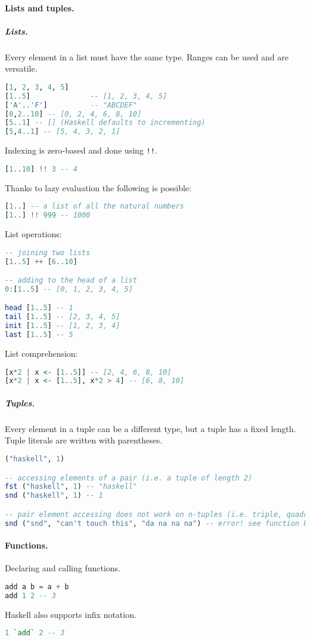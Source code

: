 \paragraph{Lists and tuples.}
\subparagraph{Lists.}
Every element in a list must have the same type. Ranges can be used and are versatile.
\begin{lstlisting}[language=haskell, style=snippet]
[1, 2, 3, 4, 5]
[1..5]              -- [1, 2, 3, 4, 5]
['A'..'F']          -- "ABCDEF"
[0,2..10] -- [0, 2, 4, 6, 8, 10]
[5..1] -- [] (Haskell defaults to incrementing)
[5,4..1] -- [5, 4, 3, 2, 1]
\end{lstlisting}
Indexing is zero-based and done using \texttt{!!}.
\begin{lstlisting}[language=haskell, style=snippet]
[1..10] !! 3 -- 4
\end{lstlisting}
Thanks to lazy evaluation the following is possible:
\begin{lstlisting}[language=haskell, style=snippet]
[1..] -- a list of all the natural numbers
[1..] !! 999 -- 1000
\end{lstlisting}
List operations:
\begin{lstlisting}[language=haskell, style=snippet]
-- joining two lists
[1..5] ++ [6..10]

-- adding to the head of a list
0:[1..5] -- [0, 1, 2, 3, 4, 5]

head [1..5] -- 1
tail [1..5] -- [2, 3, 4, 5]
init [1..5] -- [1, 2, 3, 4]
last [1..5] -- 5
\end{lstlisting}
List comprehension:
\begin{lstlisting}[language=haskell, style=snippet]
[x*2 | x <- [1..5]] -- [2, 4, 6, 8, 10]
[x*2 | x <- [1..5], x*2 > 4] -- [6, 8, 10]
\end{lstlisting}

\subparagraph{Tuples.} Every element in a tuple can be a different type, but a tuple has a fixed length. Tuple literals are written with parentheses.
\begin{lstlisting}[language=haskell, style=snippet]
("haskell", 1)

-- accessing elements of a pair (i.e. a tuple of length 2)
fst ("haskell", 1) -- "haskell"
snd ("haskell", 1) -- 1

-- pair element accessing does not work on n-tuples (i.e. triple, quadruple, etc)
snd ("snd", "can't touch this", "da na na na") -- error! see function below
\end{lstlisting}

\paragraph{Functions.}
Declaring and calling functions.
\begin{lstlisting}[language=haskell, style=snippet]
add a b = a + b
add 1 2 -- 3
\end{lstlisting}
Haskell also supports infix notation.
\begin{lstlisting}[language=haskell, style=snippet]
1 `add` 2 -- 3
\end{lstlisting}

